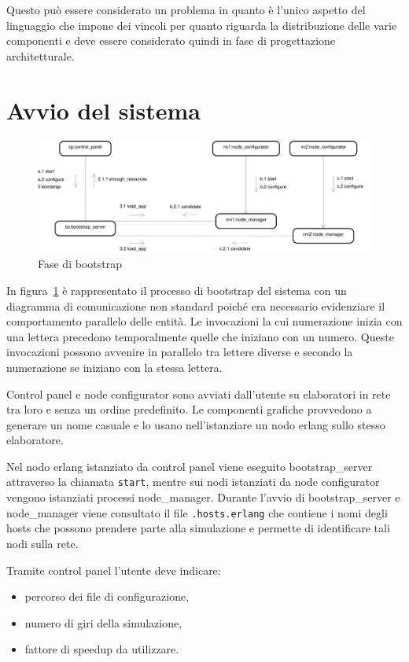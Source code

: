 \documentclass[11pt,a4paper]{report}
\newcommand{\fun}[1]{\texttt{#1}}
\begin{document}
Questo può essere considerato un problema in quanto è l'unico aspetto del linguaggio che impone dei vincoli per quanto riguarda la distribuzione delle varie componenti e deve essere considerato quindi in fase di progettazione architetturale.

\section{Avvio del sistema}
\begin{landscape}
\begin{figure}
\includegraphics[height=.25\paperheight]{diagrammi/Bootstrap}
\caption{Fase di bootstrap}
\label{fig:bootstrap}
\end{figure}
\end{landscape}

In figura~\ref{fig:bootstrap} è rappresentato il processo di bootstrap del sistema con un diagramma di comunicazione non standard poiché era necessario evidenziare il comportamento parallelo delle entità.
Le invocazioni la cui numerazione inizia con una lettera precedono temporalmente quelle che iniziano con un numero. Queste invocazioni possono avvenire in parallelo tra lettere diverse e secondo la numerazione se iniziano con la stessa lettera.

Control panel e node configurator sono avviati dall'utente su elaboratori in rete tra loro e senza un ordine predefinito. Le componenti grafiche provvedono a generare un nome casuale e lo usano nell'istanziare un nodo erlang sullo stesso elaboratore.

Nel nodo erlang istanziato da control panel viene eseguito bootstrap\_server attraverso la chiamata \fun{start}, mentre sui nodi istanziati da node configurator vengono istanziati processi node\_manager. Durante l'avvio di bootstrap\_server e node\_manager viene consultato il file \fun{.hosts.erlang} che contiene i nomi degli hosts che possono prendere parte alla simulazione e permette di identificare tali nodi sulla rete.

Tramite control panel l'utente deve indicare:
\begin{itemize}
\item percorso dei file di configurazione,
\item numero di giri della simulazione,
\item fattore di speedup da utilizzare.
\end{itemize}
\end{document}
